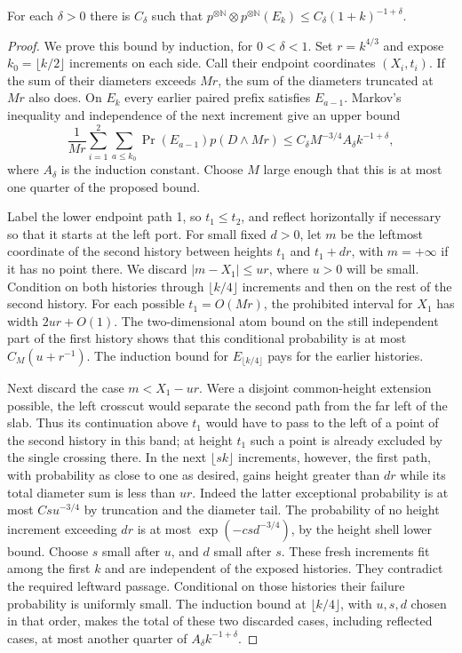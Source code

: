 \begin{lemma}\label{R:geo:fence}
For each $\delta>0$ there is $C_\delta$ such that
$p^{\otimes\mathbb N}\otimes p^{\otimes\mathbb N}(E_k)
\le C_\delta(1+k)^{-1+\delta}$.
\end{lemma}
\begin{proof}
We prove this bound by induction, for $0<\delta<1$.  Set $r=k^{4/3}$
and expose $k_0=\lfloor k/2\rfloor$ increments on each side.  Call
their endpoint coordinates $(X_i,t_i)$.  If the sum of their diameters
exceeds $Mr$, the sum of the diameters truncated at $Mr$ also does.
On $E_k$ every earlier paired prefix satisfies $E_{a-1}$.  Markov's
inequality and independence of the next increment give an upper bound
\[
 \frac1{Mr}\sum_{i=1}^2\sum_{a\le k_0}
       \Pr(E_{a-1})p(D\wedge Mr)
 \le C_\delta M^{-3/4} A_\delta k^{-1+\delta},
\]
where $A_\delta$ is the induction constant.  Choose $M$ large enough
that this is at most one quarter of the proposed bound.

Label the lower endpoint path 1, so $t_1\le t_2$, and reflect
horizontally if necessary so that it starts at the left port.  For
small fixed $d>0$, let $m$ be the leftmost coordinate of the second
history between heights $t_1$ and $t_1+dr$, with $m=+\infty$ if it
has no point there.  We discard $|m-X_1|\le ur$, where $u>0$ will
be small.  Condition on both histories through $\lfloor k/4\rfloor$
increments and then on the rest of the second history.  For each
possible $t_1=O(Mr)$, the prohibited interval for $X_1$ has width
$2ur+O(1)$.  The two-dimensional atom bound on the still independent
part of the first history shows that this conditional probability is
at most $C_M(u+r^{-1})$.  The induction bound for
$E_{\lfloor k/4\rfloor}$ pays for the earlier histories.

Next discard the case $m<X_1-ur$.  Were a disjoint common-height
extension possible, the left crosscut would separate the second path
from the far left of the slab.  Thus its continuation above $t_1$
would have to pass to the left of a point of the second history in
this band; at height $t_1$ such a point is already excluded by the
single crossing there.  In the next $\lfloor sk\rfloor$ increments,
however, the first path, with probability as close to one as desired,
gains height greater than $dr$ while its total diameter sum is less
than $ur$.  Indeed the latter exceptional probability is at most
$C s u^{-3/4}$ by truncation and the diameter tail.  The probability
of no height increment exceeding $dr$ is at most
$\exp(-c s d^{-3/4})$, by the height shell lower bound.  Choose $s$
small after $u$, and $d$ small after $s$.  These fresh increments
fit among the first $k$ and are independent of the exposed histories.
They contradict the required leftward passage.  Conditional on those
histories their failure probability is uniformly small.  The induction
bound at $\lfloor k/4\rfloor$, with $u,s,d$ chosen in that order,
makes the total of these two discarded cases, including reflected
cases, at most another quarter of $A_\delta k^{-1+\delta}$.


\end{proof}
